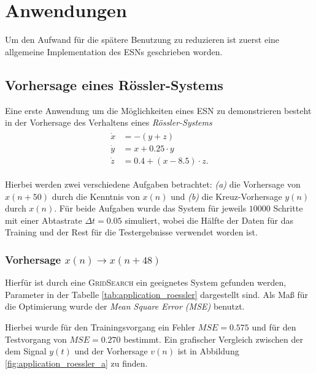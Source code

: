 \chapter{Anwendungen}
\label{chp:applications}
Um den Aufwand für die spätere Benutzung zu reduzieren ist zuerst eine allgemeine Implementation des \textsc{ESN}s geschrieben worden. 

\section{Vorhersage eines Rössler-Systems}
Eine erste Anwendung um die Möglichkeiten eines \textsc{ESN} zu demonstrieren besteht in der Vorhersage des Verhaltens eines \textit{Rössler-Systems}
\begin{align}
\label{eq:application_roessler_pde}
\begin{split}
\dot{x} &= -(y+z)\\
\dot{y} &= x + 0.25 \cdot  y\\
\dot{z} &= 0.4 + (x - 8.5)\cdot z.
\end{split}
\end{align}

Hierbei werden zwei verschiedene Aufgaben betrachtet: \textit{(a)} die Vorhersage von $x(n+50)$ durch die Kenntnis von $x(n)$ und \textit{(b)} die Kreuz-Vorhersage $y(n)$ durch $x(n)$. Für beide Aufgaben wurde das System für jeweils $10000$ Schritte mit einer Abtastrate $\Delta t = 0.05$ simuliert, wobei die Hälfte der Daten für das Training und der Rest für die Testergebnisse verwendet worden ist.

\subsection{Vorhersage $x(n) \rightarrow x(n+48)$}
Hierfür ist durch eine \textsc{GridSearch} ein geeignetes System gefunden werden, Parameter in der Tabelle \ref{tab:application_roessler} dargestellt sind. Als Maß für die Optimierung wurde der \textit{Mean Square Error (MSE)} benutzt.

Hierbei wurde für den Trainingsvorgang ein Fehler $MSE = 0.575$ und für den Testvorgang von $MSE = 0.270$ bestimmt. Ein grafischer Vergleich zwischen der dem Signal $y(t)$ und der Vorhersage $v(n)$ ist in Abbildung \ref{fig:application_roessler_a} zu finden.

